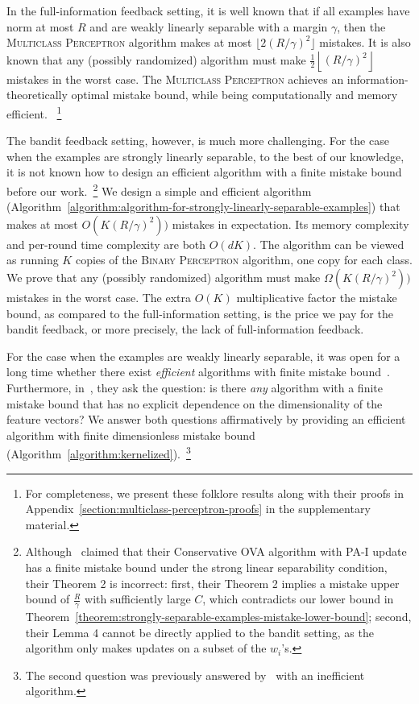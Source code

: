 In the full-information feedback setting, it is well known
\citep{Crammer-Singer-2003} that if all examples have norm at most $R$ and are
weakly linearly separable with a margin $\gamma$, then the \textsc{Multiclass
Perceptron} algorithm makes at most $\lfloor 2(R/\gamma)^2 \rfloor$ mistakes.
It is also known that any (possibly randomized) algorithm must
make $\frac{1}{2} \left\lfloor (R/\gamma)^2 \right \rfloor$ mistakes in the
worst case.
The \textsc{Multiclass Perceptron} achieves an
information-theoretically optimal mistake bound, while being
computationally and memory efficient.
~\footnote{
For completeness, we present these
folklore
results along
with their proofs in Appendix~\ref{section:multiclass-perceptron-proofs} in the
supplementary material.}

The bandit feedback setting, however, is much more challenging. For the case
when the examples are strongly linearly separable, to the best of our knowledge,
it is not known how to design an efficient algorithm with a finite mistake bound
before our work.~\footnote{Although~\cite{Chen-Chen-Zhang-Chen-Zhang-2009}
claimed that their Conservative OVA algorithm with PA-I update has a finite
mistake bound under the strong linear separability condition, their
Theorem 2 is incorrect: first, their Theorem 2
implies a mistake upper bound of $\frac{R}{\gamma}$ with
sufficiently large $C$, which contradicts our lower
bound in Theorem~\ref{theorem:strongly-separable-examples-mistake-lower-bound};
second, their Lemma 4 cannot be directly applied to the bandit
setting, as the algorithm only makes updates on a subset of the $w_i$'s.} We
design a simple and efficient algorithm
(Algorithm~\ref{algorithm:algorithm-for-strongly-linearly-separable-examples})
that makes at most $O(K (R/\gamma)^2))$ mistakes in expectation. Its memory
complexity and per-round time complexity are both $O(dK)$. The algorithm can be
viewed as running $K$ copies of the \textsc{Binary Perceptron} algorithm, one
copy for each class. We prove that any (possibly randomized) algorithm must make
$\Omega(K (R/\gamma)^2))$ mistakes in the worst case. The extra $O(K)$
multiplicative factor the mistake bound, as compared to the full-information
setting, is the price we pay for the bandit feedback, or more precisely, the
lack of full-information feedback.

For the case when the examples are weakly linearly separable, it was open for a long
time whether there exist \textit{efficient} algorithms with finite mistake
bound~\cite{Kakade-Shalev-Shwartz-Tewari-2008, Beygelzimer-Orabona-Zhang-2017}.
Furthermore, in~\cite{Kakade-Shalev-Shwartz-Tewari-2008}, they ask the question:
is there \textit{any} algorithm with a finite mistake bound that has no explicit dependence
on the dimensionality of the feature vectors? We answer both questions affirmatively by
providing an efficient algorithm with finite dimensionless mistake bound
(Algorithm~\ref{algorithm:kernelized}).~\footnote{The second question was previously
answered by~\cite{Daniely-Helbertal-2013} with an inefficient algorithm.}

